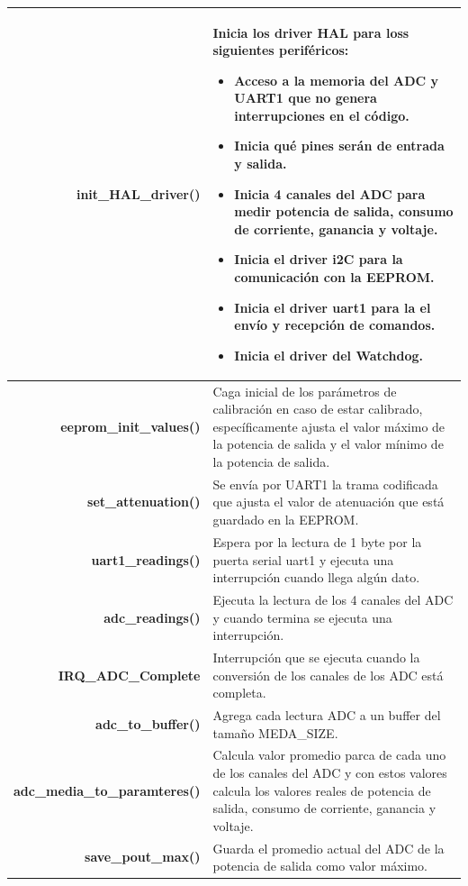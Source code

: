 \documentclass[12pt,twoside,onecolumn]{article}
\begin{document}
\begin{center}
\begin{tabular}{||r |m{10cm}| ||} 
 \hline
 \textbf{init\_HAL\_driver()} & Inicia los driver HAL para loss siguientes periféricos:
\begin{itemize}
\setlength\itemsep{-0.1em}
\item Acceso a la memoria del ADC y UART1 que no genera interrupciones en el código. 
\item Inicia qué pines serán de entrada y salida.
\item Inicia 4 canales del ADC para medir potencia de salida, consumo de corriente, ganancia y voltaje.
\item Inicia el driver i2C para la comunicación con la EEPROM.
\item Inicia el driver uart1 para la el envío y recepción de comandos.
\item Inicia el driver del Watchdog.
\end{itemize}
\\ \hline
\textbf{eeprom\_init\_values()} & Caga inicial de los parámetros de calibración en caso de estar calibrado, específicamente ajusta el valor máximo de la potencia de salida y el valor mínimo de la potencia de salida. \\ \hline 
\textbf{set\_attenuation()} & Se envía por UART1 la trama codificada que ajusta el valor de atenuación que está guardado en la EEPROM.\\ \hline 
\textbf{uart1\_readings()} & Espera por la lectura de 1 byte por la puerta serial uart1 y ejecuta una interrupción cuando llega algún dato. \\ \hline  
\textbf{adc\_readings()} & Ejecuta la lectura de los 4 canales del ADC y cuando termina se ejecuta una interrupción. \\ \hline
\textbf{IRQ\_ADC\_Complete} & Interrupción que se ejecuta cuando la conversión de los canales de los ADC está completa. \\ \hline
\textbf{adc\_to\_buffer()}  & Agrega cada lectura ADC a un buffer del tamaño MEDA\_SIZE. \\ \hline
\textbf{adc\_media\_to\_paramteres()} &  Calcula valor promedio parca de cada uno de los canales del ADC y con estos valores calcula los valores reales de potencia de salida, consumo de corriente, ganancia y voltaje. \\ \hline
\textbf{save\_pout\_max()} & Guarda el promedio actual del ADC de la potencia de salida como valor máximo. \\ \hline

\end{tabular}
\end{center}
\end{document}
